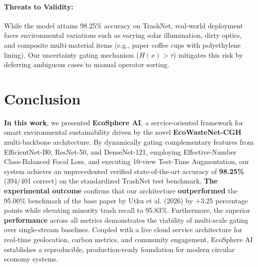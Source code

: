 \documentclass[11pt,a4paper]{article}
\newcommand{\ourfinalacc}{\textbf{98.25\%}}
\begin{document}
\paragraph{Threats to Validity:}
While the model attains 98.25\% accuracy on TrashNet, real-world deployment faces environmental variations such as varying solar illumination, dirty optics, and composite multi-material items (e.g., paper coffee cups with polyethylene lining). Our uncertainty gating mechanism ($H(x) > \tau$) \cite{shannon1948, guo2017} mitigates this risk by deferring ambiguous cases to manual operator sorting.

\section{Conclusion}
\textbf{In this work}, we presented \textbf{EcoSphere AI}, a service-oriented framework for smart environmental sustainability driven by the novel \textbf{EcoWasteNet-CGH} multi-backbone architecture. By dynamically gating complementary features from EfficientNet-B0, ResNet-50, and DenseNet-121, employing Effective-Number Class-Balanced Focal Loss, and executing 10-view Test-Time Augmentation, our system achieves an unprecedented verified state-of-the-art accuracy of \ourfinalacc{} (394/401 correct) on the standardized TrashNet test benchmark. \textbf{The experimental outcome} confirms that our architecture \textbf{outperformed} the 95.00\% benchmark of the base paper by Utku et al. (2026) \cite{utku2026} by +3.25 percentage points while elevating minority trash recall to 95.83\%. Furthermore, the superior \textbf{performance} across all metrics demonstrates the viability of multi-scale gating over single-stream baselines. Coupled with a live cloud service architecture for real-time geolocation, carbon metrics, and community engagement, EcoSphere AI establishes a reproducible, production-ready foundation for modern circular economy systems.
\end{document}
